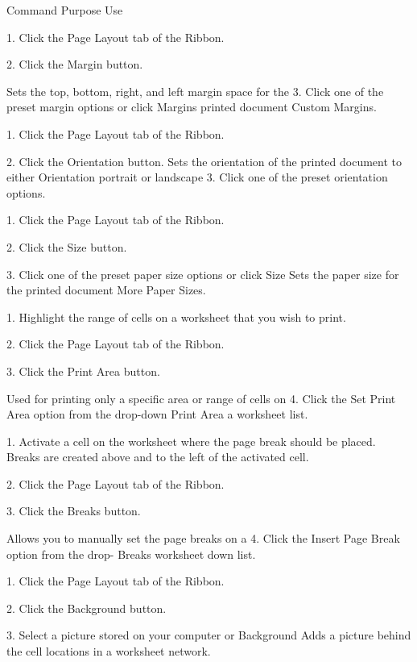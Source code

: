 Command        Purpose                                                       Use

1. Click the Page Layout tab of the Ribbon.

2. Click the Margin button.

Sets the top, bottom, right, and left margin space for the    3. Click one of the preset margin options or click
Margins        printed document                                              Custom Margins.

1. Click the Page Layout tab of the Ribbon.

2. Click the Orientation button.
Sets the orientation of the printed document to either
Orientation    portrait or landscape                                         3. Click one of the preset orientation options.

1. Click the Page Layout tab of the Ribbon.

2. Click the Size button.

3. Click one of the preset paper size options or click
Size           Sets the paper size for the printed document                  More Paper Sizes.

1. Highlight the range of cells on a worksheet that you
wish to print.

2. Click the Page Layout tab of the Ribbon.

3. Click the Print Area button.

Used for printing only a specific area or range of cells on   4. Click the Set Print Area option from the drop-down
Print Area     a worksheet                                                   list.

1. Activate a cell on the worksheet where the page
break should be placed. Breaks are created above and
to the left of the activated cell.

2. Click the Page Layout tab of the Ribbon.

3. Click the Breaks button.

Allows you to manually set the page breaks on a               4. Click the Insert Page Break option from the drop-
Breaks         worksheet                                                     down list.

1. Click the Page Layout tab of the Ribbon.

2. Click the Background button.

3. Select a picture stored on your computer or
Background Adds a picture behind the cell locations in a worksheet           network.

